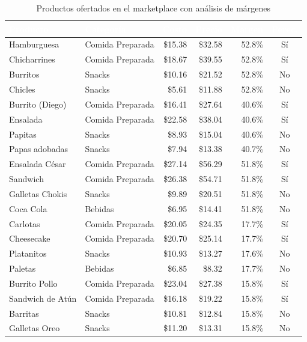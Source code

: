 \documentclass[12pt, a4paper]{article}
\begin{document}
\begin{table}[H]
\centering
\caption{Productos ofertados en el marketplace con análisis de márgenes}
\small
\begin{tabular}{l l r r r c}
\toprule
\rowcolor{tableheader}
\textcolor{white}{\textbf{Producto}} & \textcolor{white}{\textbf{Categoría}} & \textcolor{white}{\textbf{Costo}} & \textcolor{white}{\textbf{Precio}} & \textcolor{white}{\textbf{Margen}} & \textcolor{white}{\textbf{Perec.}} \\
\midrule
Hamburguesa & Comida Preparada & \$15.38 & \$32.58 & 52.8\% & Sí \\
\rowcolor{rowalt}
Chicharrines & Comida Preparada & \$18.67 & \$39.55 & 52.8\% & Sí \\
Burritos & Snacks & \$10.16 & \$21.52 & 52.8\% & No \\
\rowcolor{rowalt}
Chicles & Snacks & \$5.61 & \$11.88 & 52.8\% & No \\
Burrito (Diego) & Comida Preparada & \$16.41 & \$27.64 & 40.6\% & Sí \\
\rowcolor{rowalt}
Ensalada & Comida Preparada & \$22.58 & \$38.04 & 40.6\% & Sí \\
Papitas & Snacks & \$8.93 & \$15.04 & 40.6\% & No \\
\rowcolor{rowalt}
Papas adobadas & Snacks & \$7.94 & \$13.38 & 40.7\% & No \\
Ensalada César & Comida Preparada & \$27.14 & \$56.29 & 51.8\% & Sí \\
\rowcolor{rowalt}
Sandwich & Comida Preparada & \$26.38 & \$54.71 & 51.8\% & Sí \\
Galletas Chokis & Snacks & \$9.89 & \$20.51 & 51.8\% & No \\
\rowcolor{rowalt}
Coca Cola & Bebidas & \$6.95 & \$14.41 & 51.8\% & No \\
Carlotas & Comida Preparada & \$20.05 & \$24.35 & 17.7\% & Sí \\
\rowcolor{rowalt}
Cheesecake & Comida Preparada & \$20.70 & \$25.14 & 17.7\% & Sí \\
Platanitos & Snacks & \$10.93 & \$13.27 & 17.6\% & No \\
\rowcolor{rowalt}
Paletas & Bebidas & \$6.85 & \$8.32 & 17.7\% & No \\
Burrito Pollo & Comida Preparada & \$23.04 & \$27.38 & 15.8\% & Sí \\
\rowcolor{rowalt}
Sandwich de Atún & Comida Preparada & \$16.18 & \$19.22 & 15.8\% & Sí \\
Barritas & Snacks & \$10.81 & \$12.84 & 15.8\% & No \\
\rowcolor{rowalt}
Galletas Oreo & Snacks & \$11.20 & \$13.31 & 15.8\% & No \\
\bottomrule
\end{tabular}
\end{table}
\end{document}
